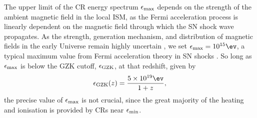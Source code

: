 The upper limit of the CR energy spectrum $\epsilon_{\rm max}$ depends on the strength of the ambient magnetic field in the local ISM, as the Fermi acceleration process is linearly dependent on the magnetic field through which the SN shock wave propagates. As the strength, generation mechanism, and distribution of magnetic fields in the early Universe remain highly uncertain \citep{DurrerNeronov2013}, we set $\epsilon_{\rm max} = 10^{15}\ev$, a typical maximum value from Fermi acceleration theory in SN shocks \citep[e.g.,][]{BlandfordEichler1987}.  So long as $\epsilon_{\rm max}$ is below the GZK cutoff, $\epsilon_{\rm \small GZK}$, at that redshift, given by \citep{StacyBromm2007}
\begin{equation}
\epsilon_{\rm \small GZK}(z) = \frac{5\times10^{19}\ev}{1+z},
\end{equation}
the precise value of $\epsilon_{\rm max}$ is not crucial, since the great majority of the heating and ionisation is provided by CRs near $\epsilon_{\rm min}$.

